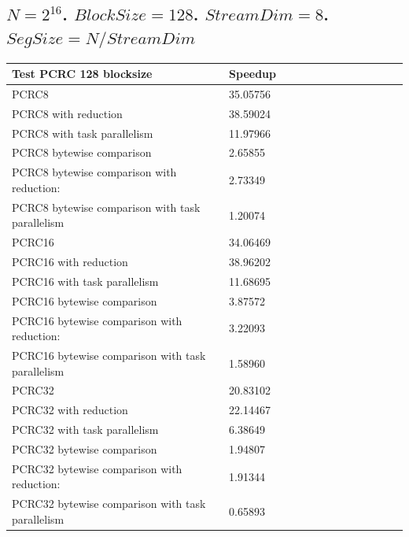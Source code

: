 \documentclass[fleqn]{IEEEtran}
\begin{document}
\subsection{$N=2^{16}$. $BlockSize=128$. $StreamDim=8$. $SegSize=N/StreamDim$}
\begin{footnotesize}
\begin{tabular}{l|l|l|l|l|r|r|r|r|r|r||c|c|}
\toprule
\textbf{Test PCRC 128 blocksize} & \textbf{Speedup} \\
\midrule
PCRC8                                           &	35.05756 \\
PCRC8 with reduction                            &	38.59024 \\
PCRC8 with task parallelism                     &	11.97966 \\
PCRC8 bytewise comparison                       &	2.65855  \\
PCRC8 bytewise comparison with reduction:       &	2.73349  \\
PCRC8 bytewise comparison with task parallelism &	1.20074  \\
PCRC16                                           &	34.06469 \\
PCRC16 with reduction                            &	38.96202 \\
PCRC16 with task parallelism                     &	11.68695 \\
PCRC16 bytewise comparison                       &	3.87572  \\
PCRC16 bytewise comparison with reduction:       &	3.22093  \\
PCRC16 bytewise comparison with task parallelism &	1.58960  \\
PCRC32                                           &	20.83102 \\
PCRC32 with reduction                            &	22.14467 \\
PCRC32 with task parallelism                     &	6.38649  \\
PCRC32 bytewise comparison                       &	1.94807  \\
PCRC32 bytewise comparison with reduction:       &	1.91344  \\
PCRC32 bytewise comparison with task parallelism &	0.65893  \\
\bottomrule
\end{tabular}
\end{footnotesize}
\end{document}
